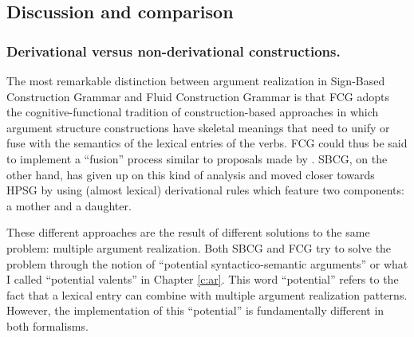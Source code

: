 \subsection{Discussion and comparison}
\label{s:active-passive}

\subsubsection{Derivational versus non-derivational constructions.}

The most remarkable distinction between argument realization in Sign-Based Construction Grammar and Fluid Construction Grammar is that FCG adopts the cognitive-functional tradition of construction-based approaches in which argument structure constructions have skeletal meanings that need to unify or fuse with the semantics of the lexical entries of the verbs. FCG could thus be said to implement a ``fusion'' process similar to proposals made by \citet{goldberg95construction}. SBCG, on the other hand, has given up on this kind of analysis and moved closer towards HPSG by using (almost lexical) derivational rules which feature two components: a mother and a daughter.

These different approaches are the result of different solutions to the same problem: multiple argument realization. Both SBCG and FCG try to solve the problem through the notion of ``potential syntactico-semantic arguments'' \citep{sag07sbcg} or what I called ``potential valents'' in Chapter \ref{c:ar}. This word ``potential'' refers to the fact that a lexical entry can combine with multiple argument realization patterns. However, the implementation of this ``potential'' is fundamentally different in both formalisms.

